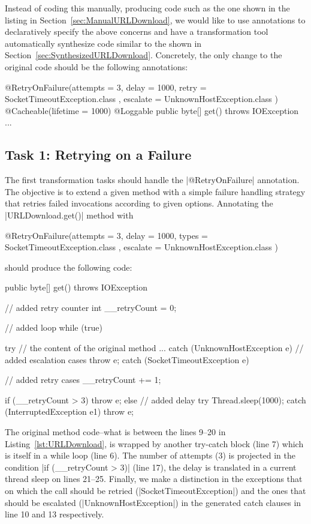 Instead of coding this manually, producing code such as the one shown in the listing in Section~\ref{sec:ManualURLDownload}, we would like to use annotations to declaratively specify the above concerns and have a transformation tool automatically synthesize code similar to the shown in Section~\ref{sec:SynthesizedURLDownload}.
Concretely, the only change to the original code should be the following annotations:
%
\begin{javacode}
@RetryOnFailure(attempts = 3, delay = 1000, retry = { SocketTimeoutException.class }, escalate = { UnknownHostException.class })
@Cacheable(lifetime = 1000)
@Loggable
public byte[] get() throws IOException { ... }
\end{javacode}

\subsection{Task 1: Retrying on a Failure}

The first transformation tasks should handle the \javainline|@RetryOnFailure| annotation.
The objective is to extend a given method with a simple failure handling strategy that retries failed invocations according to given options.
Annotating the \javainline|URLDownload.get()| method with
%
\begin{javacode}
@RetryOnFailure(attempts = 3, delay = 1000, types = { SocketTimeoutException.class }, escalate = { UnknownHostException.class })
\end{javacode}
%
should produce the following code:
%
\begin{javacode}
public byte[] get() throws IOException {
  // added retry counter 
  int __retryCount = 0;

  // added loop
  while (true) {
    try {
      // the content of the original method
      ...
    } catch (UnknownHostException e) {
      // added escalation cases
      throw e;
    } catch (SocketTimeoutException e) {
      // added retry cases
      __retryCount += 1;

      if (__retryCount > 3) {
        throw e;
      } else {
        // added delay 
        try {
          Thread.sleep(1000);
        } catch (InterruptedException e1) {
          throw e;
        }
      }
    }
  }
}
\end{javacode}

The original method code--\Ie what is between the lines 9--20 in Listing~\ref{lst:URLDownload}, is wrapped by another try-catch block (line 7) which is itself in a while loop (line 6).
The number of attempts (3) is projected in the condition \javainline|if (__retryCount > 3)| (line 17), the delay is translated in a current thread sleep on lines 21--25.
Finally, we make a distinction in the exceptions that on which the call should be retried (\javainline|SocketTimeoutException|) and the ones that should be escalated (\javainline|UnknownHostException|) in the generated catch clauses in line 10 and 13 respectively.

